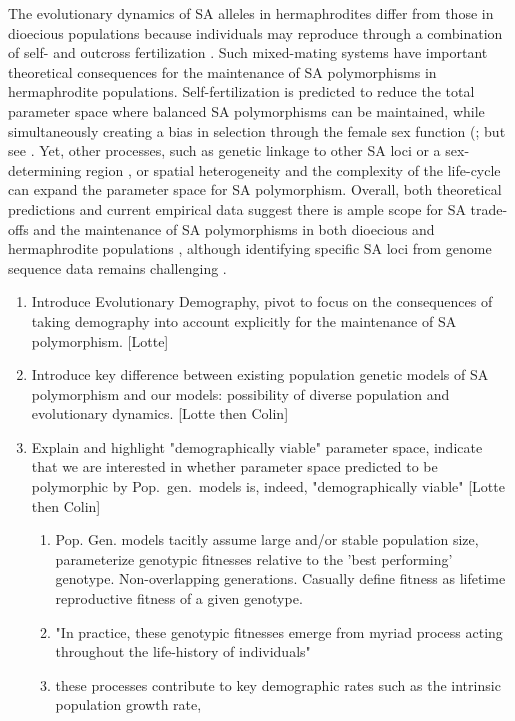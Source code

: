 \documentclass[11pt]{article}
\begin{document}
The evolutionary dynamics of SA alleles in hermaphrodites differ from those in dioecious populations because individuals may reproduce through a combination of self- and outcross fertilization \citep{Goodwillie2005, Igic2006, JarneAuld2006}. Such mixed-mating systems have important theoretical consequences for the maintenance of SA polymorphisms in hermaphrodite populations. Self-fertilization is predicted to reduce the total parameter space where balanced SA polymorphisms can be maintained, while simultaneously creating a bias in selection through the female sex function (\citealt{JordanConnallon2014}; but see \citealt{Tazzyman2015}. Yet, other processes, such as genetic linkage to other SA loci or a sex-determining region \citep{Otto2011, JordanCharlesworth2012, Olito2017, Olito2019}, or spatial heterogeneity and the complexity of the life-cycle \citep{Olito-etal-2018,ConnallonSharmaOlito2019} can expand the parameter space for SA polymorphism. Overall, both theoretical predictions and current empirical data suggest there is ample scope for SA trade-offs and the maintenance of SA polymorphisms in both dioecious and hermaphrodite populations \citep{Abbott2011, WangBarrett2020}, although identifying specific SA loci from genome sequence data remains challenging \citep{RuzickaESEB2020}.
\bigskip

\begin{enumerate}
	\item Introduce Evolutionary Demography, pivot to focus on the consequences of taking demography into account explicitly for the maintenance of SA polymorphism. [Lotte]
	\item Introduce key difference between existing population genetic models of SA polymorphism and our models: possibility of diverse population and evolutionary dynamics. [Lotte then Colin]
	\item Explain and highlight "demographically viable" parameter space, indicate that we are interested in whether parameter space predicted to be polymorphic by Pop.~gen.~models is, indeed, "demographically viable" [Lotte then Colin]
		\begin{enumerate}
			\item Pop. Gen. models tacitly assume large and/or stable population size, parameterize genotypic fitnesses relative to the 'best performing' genotype. Non-overlapping generations. Casually define fitness as lifetime reproductive fitness of a given genotype.
			\item "In practice, these genotypic fitnesses emerge from myriad process acting throughout the life-history of individuals"
			\item these processes contribute to key demographic rates such as the intrinsic population growth rate, 
		\end{enumerate}
\end{enumerate}
\bigskip
\end{document}
